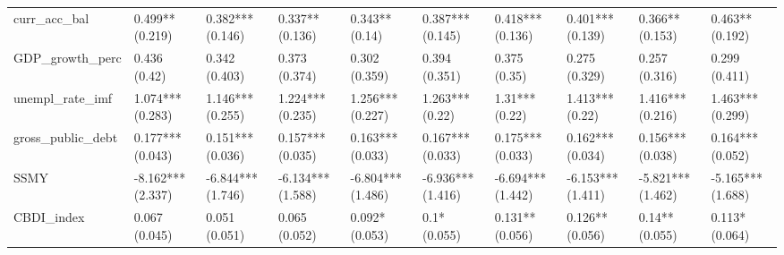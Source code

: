 \begin{table}[ht]
\begin{tabular}{llllllllll}
  curr\_acc\_bal & 0.499** (0.219) & 0.382*** (0.146) & 0.337** (0.136) & 0.343** (0.14) & 0.387*** (0.145) & 0.418*** (0.136) & 0.401*** (0.139) & 0.366** (0.153) & 0.463** (0.192) \\ 
  GDP\_growth\_perc & 0.436 (0.42) & 0.342 (0.403) & 0.373 (0.374) & 0.302 (0.359) & 0.394 (0.351) & 0.375 (0.35) & 0.275 (0.329) & 0.257 (0.316) & 0.299 (0.411) \\ 
  unempl\_rate\_imf & 1.074*** (0.283) & 1.146*** (0.255) & 1.224*** (0.235) & 1.256*** (0.227) & 1.263*** (0.22) & 1.31*** (0.22) & 1.413*** (0.22) & 1.416*** (0.216) & 1.463*** (0.299) \\ 
  gross\_public\_debt & 0.177*** (0.043) & 0.151*** (0.036) & 0.157*** (0.035) & 0.163*** (0.033) & 0.167*** (0.033) & 0.175*** (0.033) & 0.162*** (0.034) & 0.156*** (0.038) & 0.164*** (0.052) \\ 
  SSMY & -8.162*** (2.337) & -6.844*** (1.746) & -6.134*** (1.588) & -6.804*** (1.486) & -6.936*** (1.416) & -6.694*** (1.442) & -6.153*** (1.411) & -5.821*** (1.462) & -5.165*** (1.688) \\ 
  CBDI\_index & 0.067 (0.045) & 0.051 (0.051) & 0.065 (0.052) & 0.092* (0.053) & 0.1* (0.055) & 0.131** (0.056) & 0.126** (0.056) & 0.14** (0.055) & 0.113* (0.064) \\ 
   \bottomrule
\end{tabular}
\endgroup
\end{table}
